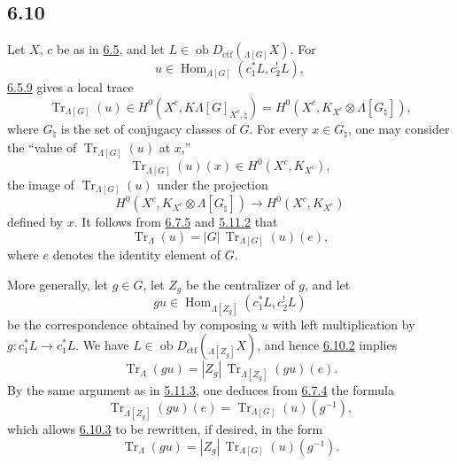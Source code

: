 \documentclass[11pt]{article}
\DeclareMathOperator{\Hom}{Hom}
\providecommand{\Tr}{\operatorname{Tr}}
\providecommand{\Tr}{\operatorname{Tr}}
\providecommand{\Ob}{\operatorname{ob}}
\providecommand{\Tr}{\operatorname{Tr}}
\providecommand{\Hom}{\operatorname{Hom}}
\providecommand{\Ob}{\operatorname{ob}}
\providecommand{\Tr}{\operatorname{Tr}}
\providecommand{\Ob}{\operatorname{Ob}}
\providecommand{\Hom}{\operatorname{Hom}}
\providecommand{\Tr}{\operatorname{Tr}}
\providecommand{\Ob}{\operatorname{ob}}
\providecommand{\Ob}{\operatorname{Ob}}
\begin{document}
\subsection*{6.10}\label{sga5:IIIB:subsection:6.10}
Let $X$, $c$ be as in \hyperref[sga5:IIIB:subsection:6.5]{6.5}, and let $L\in\Ob D_{\mathrm{ctf}}({}_{\Lambda[G]}X)$. For
\[
u\in\Hom_{\Lambda[G]}(c_1^*L,c_2^!L),
\]
\hyperref[sga5:IIIB:equation:6.5.9]{6.5.9} gives a local trace
\begin{equation}
\Tr_{\Lambda[G]}(u)\in
H^0(X^c,K\Lambda[G]_{X^c,\natural})
=H^0(X^c,K_{X^c}\otimes\Lambda[G_{\natural}]),
\tag{6.10.1}\label{sga5:IIIB:equation:6.10.1}
\end{equation}
where $G_{\natural}$ is the set of conjugacy classes of $G$. For every $x\in G_{\natural}$, one may consider the “value of $\Tr_{\Lambda[G]}(u)$ at $x$,”
\[
\Tr_{\Lambda[G]}(u)(x)\in H^0(X^c,K_{X^c}),
\]
the image of $\Tr_{\Lambda[G]}(u)$ under the projection
\[
H^0(X^c,K_{X^c}\otimes\Lambda[G_{\natural}])
\longrightarrow H^0(X^c,K_{X^c})
\]
defined by $x$. It follows from \hyperref[sga5:IIIB:equation:6.7.5]{6.7.5} and \hyperref[sga5:IIIB:equation:5.11.2]{5.11.2} that
\begin{equation}
\Tr_{\Lambda}(u)=|G|\,\Tr_{\Lambda[G]}(u)(e),
\tag{6.10.2}\label{sga5:IIIB:equation:6.10.2}
\end{equation}
where $e$ denotes the identity element of $G$.

More generally, let $g\in G$, let $Z_g$ be the centralizer of $g$, and let
\[
gu\in\Hom_{\Lambda[Z_g]}(c_1^*L,c_2^!L)
\]
be the correspondence obtained by composing $u$ with left multiplication by $g:c_1^*L\to c_1^*L$. We have $L\in\Ob D_{\mathrm{ctf}}({}_{\Lambda[Z_g]}X)$, and hence \hyperref[sga5:IIIB:equation:6.10.2]{6.10.2} implies
\begin{equation}
\Tr_{\Lambda}(gu)=|Z_g|\,\Tr_{\Lambda[Z_g]}(gu)(e).
\tag{6.10.3}\label{sga5:IIIB:equation:6.10.3}
\end{equation}
By the same argument as in \hyperref[sga5:IIIB:proposition:5.11.3]{5.11.3}, one deduces from \hyperref[sga5:IIIB:equation:6.7.4]{6.7.4} the formula
\begin{equation}
\Tr_{\Lambda[Z_g]}(gu)(e)=\Tr_{\Lambda[G]}(u)(g^{-1}),
\tag{6.10.4}\label{sga5:IIIB:equation:6.10.4}
\end{equation}
which allows \hyperref[sga5:IIIB:equation:6.10.3]{6.10.3} to be rewritten, if desired, in the form
\begin{equation}
\Tr_{\Lambda}(gu)=|Z_g|\,\Tr_{\Lambda[G]}(u)(g^{-1}).
\tag{6.10.5}\label{sga5:IIIB:equation:6.10.5}
\end{equation}
\end{document}
